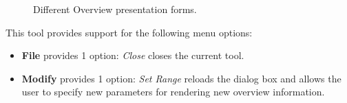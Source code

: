 \documentclass[10pt]{report}
\begin{document}
\begin{figure}[!ht]
  \centering
  \caption{Different Overview presentation forms.}
  \label{overview forms}
\end{figure}

%

This tool provides support for the following menu options:

\begin{itemize}
\item {\bf File} provides 1 option: {\it Close} closes the current tool.
\item {\bf Modify} provides 1 option: {\it Set Range} reloads the
dialog box and allows the user to specify new parameters for rendering
new overview information.
\end{itemize}
\end{document}

